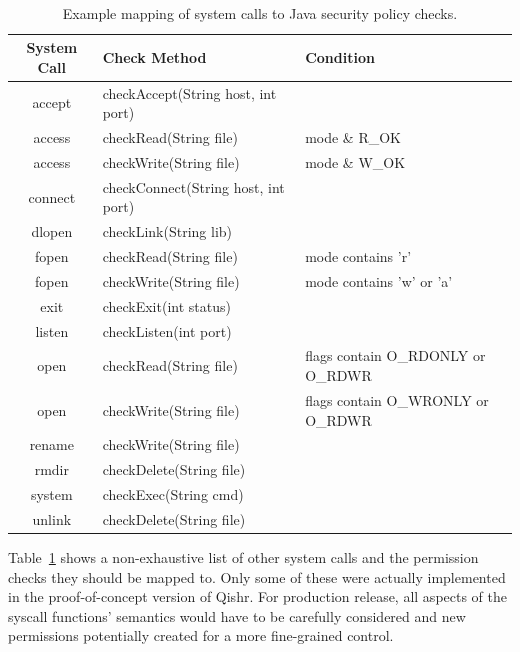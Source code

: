 \documentclass[a4paper,12pt,twoside,openright]{report}
\begin{document}
\begin{table}
	\centering
	\scriptsize
	\tt
	\begin{tabular}{|c|l|l|}
		\hline
		\normalfont\bfseries System Call	& \normalfont\bfseries Check Method	& \normalfont\bfseries Condition \\
		\hline
		accept						& checkAccept(String host, int port) 		& \\
		access						& checkRead(String file)				& mode \& R\_OK  \\
		access						& checkWrite(String file)				& mode \& W\_OK \\
		connect						& checkConnect(String host, int port)		& \\
		dlopen						& checkLink(String lib)				& \\
		fopen						& checkRead(String file)				& mode \textnormal{contains} 'r' \\
		fopen						& checkWrite(String file)				& mode \textnormal{contains} 'w' \textnormal{or} 'a' \\
		exit							& checkExit(int status)				& \\
		listen						& checkListen(int port)				& \\
		open							& checkRead(String file)				& flags \textnormal{contain} O\_RDONLY \textnormal{or} O\_RDWR \\
		open							& checkWrite(String file)				& flags \textnormal{contain} O\_WRONLY \textnormal{or} O\_RDWR \\
		rename						& checkWrite(String file)				& \\
		rmdir						& checkDelete(String file)				& \\
		system						& checkExec(String cmd)				& \\
		unlink						& checkDelete(String file)				& \\
		\hline
	\end{tabular}
	\normalfont\normalsize
	\caption{Example mapping of system calls to Java security policy checks.}
	\label{table:SecurityChecks}
\end{table}

Table~\ref{table:SecurityChecks} shows a non-exhaustive list of other system calls and the permission checks they should be mapped to. Only some of these were actually implemented in the proof-of-concept version of Qishr. For production release, all aspects of the syscall functions' semantics would have to be carefully considered and new permissions potentially created for a more fine-grained control.
\end{document}
